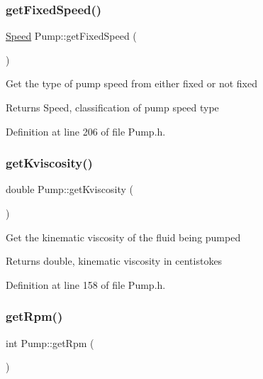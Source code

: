 \mbox{\label{class_pump_ae9a63b7e616ba2ef7723d1040af241b4}} 
\subsubsection{\texorpdfstring{get\+Fixed\+Speed()}{getFixedSpeed()}}
{\footnotesize\ttfamily \hyperlink{class_pump_ae443603074ebca82f0b89209482d10b6}{Speed} Pump\+::get\+Fixed\+Speed (\begin{DoxyParamCaption}{ }\end{DoxyParamCaption})\hspace{0.3cm}{\ttfamily [inline]}}

Get the type of pump speed from either fixed or not fixed \begin{DoxyReturn}{Returns}
Speed, classification of pump speed type 
\end{DoxyReturn}


Definition at line 206 of file Pump.\+h.

\mbox{\label{class_pump_a7b834ffb06cbfd643043e3a26ca1af6e}} 
\subsubsection{\texorpdfstring{get\+Kviscosity()}{getKviscosity()}}
{\footnotesize\ttfamily double Pump\+::get\+Kviscosity (\begin{DoxyParamCaption}{ }\end{DoxyParamCaption})\hspace{0.3cm}{\ttfamily [inline]}}

Get the kinematic viscosity of the fluid being pumped \begin{DoxyReturn}{Returns}
double, kinematic viscosity in centistokes 
\end{DoxyReturn}


Definition at line 158 of file Pump.\+h.

\mbox{\label{class_pump_a66870deae37979d64a910b89c6977b26}} 
\subsubsection{\texorpdfstring{get\+Rpm()}{getRpm()}}
{\footnotesize\ttfamily int Pump\+::get\+Rpm (\begin{DoxyParamCaption}{ }\end{DoxyParamCaption})\hspace{0.3cm}{\ttfamily [inline]}}

